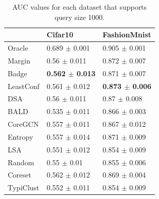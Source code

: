 \documentclass[]{article}
\begin{document}
\hspace{10mm}
\begin{minipage}{0.47\linewidth}
	\begin{table}[H]
		\caption{AUC values for each dataset that supports query size 1000.}
		\begin{tabular}{l|ll}
			& Cifar10 & FashionMnist \\
			\hline
			Oracle & 0.689 $\pm$ {\small 0.001} & 0.905 $\pm$ {\small 0.001} \\
			Margin & 0.56 $\pm$ {\small 0.011} & 0.872 $\pm$ {\small 0.007} \\
			Badge & \textbf{0.562 $\pm$ {\small 0.013}} & 0.871 $\pm$ {\small 0.007} \\
			LeastConf & 0.561 $\pm$ {\small 0.012} & \textbf{0.873 $\pm$ {\small 0.006}} \\
			DSA & 0.56 $\pm$ {\small 0.011} & 0.87 $\pm$ {\small 0.008} \\
			BALD & 0.535 $\pm$ {\small 0.011} & 0.866 $\pm$ {\small 0.003} \\
			CoreGCN & 0.557 $\pm$ {\small 0.011} & 0.867 $\pm$ {\small 0.012} \\
			Entropy & 0.557 $\pm$ {\small 0.014} & 0.871 $\pm$ {\small 0.009} \\
			LSA & 0.551 $\pm$ {\small 0.012} & 0.854 $\pm$ {\small 0.009} \\
			Random & 0.55 $\pm$ {\small 0.01} & 0.855 $\pm$ {\small 0.006} \\
			Coreset & 0.562 $\pm$ {\small 0.012} & 0.869 $\pm$ {\small 0.004} \\
			TypiClust & 0.552 $\pm$ {\small 0.011} & 0.854 $\pm$ {\small 0.009} 	
		\end{tabular}
	\end{table}
\end{minipage}



\end{document}
